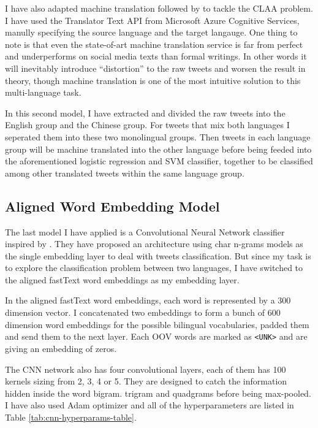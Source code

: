 \documentclass[11pt,a4paper]{article}
\begin{document}
I have also adapted machine translation followed by \citet{bogdanova2014cross} to tackle the CLAA problem. I have used the Translator Text API from Microsoft Azure Cognitive Services, manully specifying the source language and the target langauge. One thing to note is that even the state-of-art machine translation service is far from perfect and underperforms on social media texts than formal writings. In other words it will inevitably introduce ``distortion'' to the raw tweets and worsen the result in theory, though machine translation is one of the most intuitive solution to this multi-language task.

In this second model, I have extracted and divided the raw tweets into the English group and the Chinese group. For tweets that mix both languages I seperated them into these two monolingual groups. Then tweets in each language group will be machine translated into the other language before being feeded into the aforementioned logistic regression and SVM classifier, together to be classified among other translated tweets within the same language group.

\subsection{Aligned Word Embedding Model}

The last model I have applied is a Convolutional Neural Network classifier inspired by \citet{shrestha2017convolutional}. They have proposed an architecture using char n-grams models as the single embedding layer to deal with tweets classification. But since my task is to explore the classification problem between two languages, I have switched to the aligned fastText word embeddings \cite{bojanowski2017enriching} \cite{joulin2018loss} as my embedding layer.

In the aligned fastText word embeddings, each word is represented by a 300 dimension vector. I concatenated two embeddings to form a bunch of 600 dimension word embeddings for the possible bilingual vocabularies, padded them and send them to the next layer. Each OOV words are marked as \verb|<UNK>| and are giving an embedding of zeros.

The CNN network also has four convolutional layers, each of them has 100 kernels sizing from 2, 3, 4 or 5. They are designed to catch the information hidden inside the word bigram. trigram and quadgrams before being max-pooled. I have also used Adam optimizer \cite{kingma2014adam} and all of the hyperparameters are listed in Table \ref{tab:cnn-hyperparams-table}.
\end{document}

